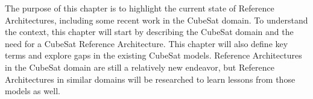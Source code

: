 The purpose of this chapter is to highlight the current state of Reference Architectures, including some recent work in the CubeSat domain. To understand the context, this chapter will start by describing the CubeSat domain and the need for a CubeSat Reference Architecture. This chapter will also define key terms and explore gaps in the existing CubeSat models. Reference Architectures in the CubeSat domain are still a relatively new endeavor, but Reference Architectures in similar domains will be researched to learn lessons from those models as well. 
